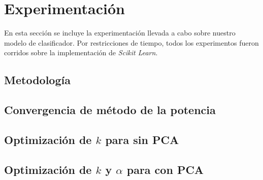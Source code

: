 \section{Experimentación}%
\label{sec:experimentacion}

En esta sección se incluye la experimentación llevada a cabo sobre nuestro
modelo de clasificador.
%
Por restricciones de tiempo, todos los experimentos fueron corridos sobre la
implementación de \textit{Scikit Learn}.

\subsection{Metodología}%
\label{sub:metodologia}

\subsection{Convergencia de método de la potencia}%
\label{sub:pm}


\subsection{Optimización de $k$ para \knn{} sin PCA}%
\label{sub:knn_sin_pca}

\subsection{Optimización de $k$ y $\alpha$ para \knn{} con PCA}%
\label{sub:alpha_k_knn_pca}
